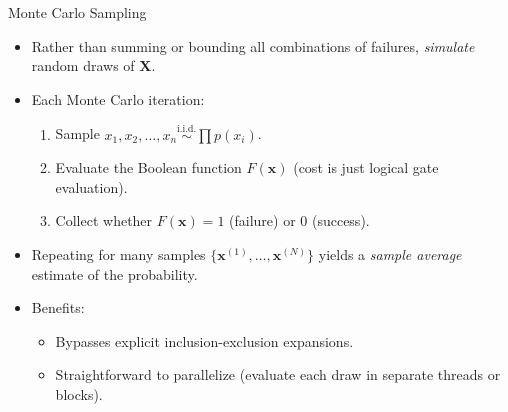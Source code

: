 \begin{frame}{Monte Carlo Sampling}
\begin{itemize}
  \item Rather than summing or bounding all combinations of failures, \emph{simulate} random draws of \(\mathbf{X}\).
  \item Each Monte Carlo iteration:
    \begin{enumerate}
      \item Sample \(x_1, x_2,\dots,x_n \overset{\text{i.i.d.}}{\sim} \prod p(x_i)\).
      \item Evaluate the Boolean function \(F(\mathbf{x})\) (cost is just logical gate evaluation).
      \item Collect whether \(F(\mathbf{x})=1\) (failure) or 0 (success).
    \end{enumerate}
  \item Repeating for many samples \(\{\mathbf{x}^{(1)}, \dots, \mathbf{x}^{(N)}\}\) yields a \emph{sample average} estimate of the probability.
  \item Benefits:
    \begin{itemize}
      \item Bypasses explicit inclusion-exclusion expansions.
      \item Straightforward to parallelize (evaluate each draw in separate threads or blocks).
    \end{itemize}
\end{itemize}
\end{frame}


\fi